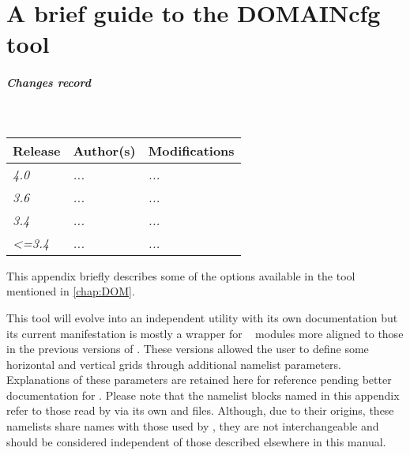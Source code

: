 \documentclass[../main/NEMO_manual]{subfiles}
\begin{document}
\chapter{A brief guide to the DOMAINcfg tool}
\label{apdx:DOMCFG}


\thispagestyle{plain}

\chaptertoc

\paragraph{Changes record} ~\\

{\footnotesize
  \begin{tabularx}{\textwidth}{l||X|X}
    Release & Author(s) & Modifications \\
    \hline
    {\em   4.0} & {\em ...} & {\em ...} \\
    {\em   3.6} & {\em ...} & {\em ...} \\
    {\em   3.4} & {\em ...} & {\em ...} \\
    {\em <=3.4} & {\em ...} & {\em ...}
  \end{tabularx}
}

\clearpage

This appendix briefly describes some of the options available in the
 tool mentioned in \autoref{chap:DOM}.

This tool will evolve into an independent utility with its own documentation but its
current manifestation is mostly a wrapper for \NEMO\  modules more aligned to
those in the previous versions of \NEMO. These versions allowed the user to define some
horizontal and vertical grids through additional namelist parameters. Explanations of
these parameters are retained here for reference pending better documentation for
. Please note that the namelist blocks named in this appendix refer to
those read by  via its own  and
 files. Although, due to their origins, these namelists share names
with those used by \NEMO, they are not interchangeable and should be considered independent
of those described elsewhere in this manual.
\end{document}
